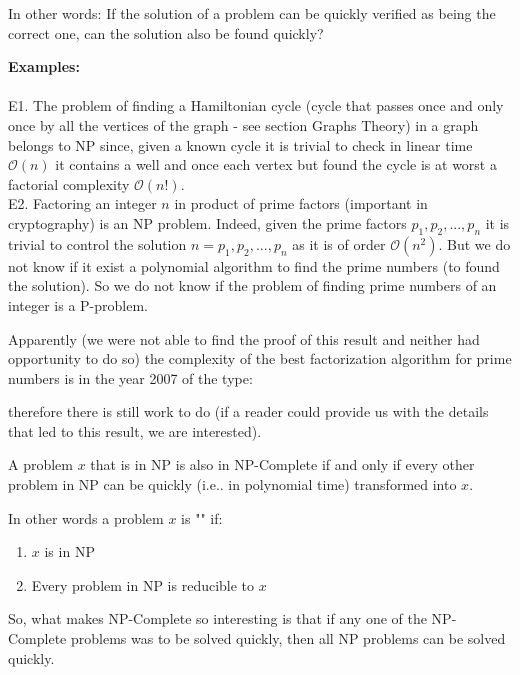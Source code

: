 	In other words: If the solution of a problem can be quickly verified as being the correct one, can the solution also be found quickly?
	\begin{tcolorbox}[colframe=black,colback=white,sharp corners]
	\textbf{{\Large {}}Examples:}\\\\
	E1. The problem of finding a Hamiltonian cycle (cycle that passes once and only once by all the vertices of the graph - see section Graphs Theory) in a graph belongs to NP since, given a known cycle it is trivial to check in linear time $\mathcal{O}(n)$ it contains a well and once each vertex but found the cycle is at worst a factorial complexity $\mathcal{O}(n!)$.\\
	
	E2. Factoring an integer $n$ in product of prime factors (important in cryptography) is an NP problem. Indeed, given the prime factors $p_1,p_2,...,p_n$ it is trivial to control the solution $n=p_1,p_2,...,p_n$ as it is of order $\mathcal{O}(n^2)$. But we do not know if it exist a polynomial algorithm to find the prime numbers (to found the solution). So we do not know if the problem of finding prime numbers of an integer is a P-problem.
	\end{tcolorbox}
	
	\begin{tcolorbox}[title=Remark,colframe=black,arc=10pt]
Apparently (we were not able to find the proof of this result and neither had opportunity to do so) the complexity of the best factorization algorithm for prime numbers is in the year 2007 of the type:
	
therefore there is still work to do (if a reader could provide us with the details that led to this result, we are interested).
	\end{tcolorbox}

A problem $x$ that is in NP is also in NP-Complete if and only if every other problem in NP can be quickly (i.e.. in polynomial time) transformed into $x$.

In other words a problem $x$ is "" if:
	\begin{enumerate}
		\item $x$ is in NP
		\item Every problem in NP is reducible to $x$
	\end{enumerate}
So, what makes NP-Complete so interesting is that if any one of the NP-Complete problems was to be solved quickly, then all NP problems can be solved quickly.

